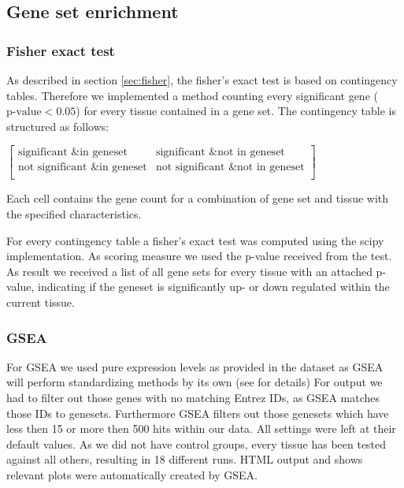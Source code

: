   \subsection[Gene set enrichment]{Gene set enrichment}
    \subsubsection[Fisher exact test]{Fisher exact test}
    As described in section \ref{sec:fisher}, the fisher's exact test is based
on contingency tables. Therefore we implemented a method counting every
significant gene ($\text{p-value} < 0.05$) for every tissue contained in a gene
set. The contingency table is structured as follows:
\begin{center}
$\left[\begin{array}{cc}
\text{significant \& in geneset} & \text{significant \& not in geneset} \\
\text{not significant \& in geneset} & \text{not significant \& not in geneset} \\
\end{array}\right]$
\end{center}
    Each cell contains the gene count for a combination of gene set and tissue
    with the specified characteristics.

    For every contingency table a fisher's exact test was computed using the
scipy implementation. As scoring measure we used the p-value received from the
test. As result we received a list of all gene sets for every tissue with an
attached p-value, indicating if the geneset is significantly up- or down
regulated within the current tissue.
    
    \subsubsection[GSEA]{GSEA}
    For GSEA we used pure expression levels as provided in the dataset as GSEA
will perform standardizing methods by its own (see \cite{Subramanian2005} for
details) For output we had to filter out those genes with no matching Entrez
IDs, as GSEA matches those IDs to genesets. Furthermore GSEA filters out those
genesets which have less then 15 or more then 500 hits within our data. All
settings were left at their default values. As we did not have control
groups, every tissue has been tested against all others, resulting in 18
different runs. HTML output and shows relevant plots were automatically created
by GSEA.